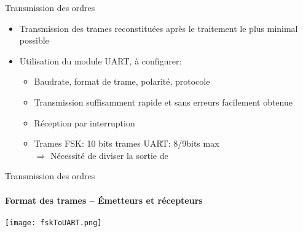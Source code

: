 \begin{frame}
  \tableofcontents[currentsection]
\end{frame}

\begin{frame}{Transmission des ordres}
\begin{itemize}
  \item Transmission des trames reconstituées après le traitement le plus minimal possible
  \item Utilisation du module UART, à configurer:
  \begin{itemize}
    \item Baudrate, format de trame, polarité, protocole
    \item Transmission suffisamment rapide et sans erreurs facilement obtenue
    \item Réception par interruption
    \item Trames FSK: 10 bits trames UART: 8/9bits max\\
    $\Rightarrow$ Nécessité de diviser la sortie de 
  \end{itemize}
\end{itemize}
\end{frame}

\begin{frame}{Transmission des ordres}
\framesubtitle{Format des trames -- \'Emetteurs et récepteurs}
  \texttt{[image: fskToUART.png]}
\end{frame}

